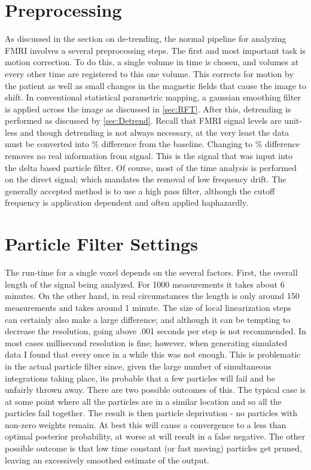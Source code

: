 \section{Preprocessing}
\label{sec:Methods Preprocessing}
As discussed in the section on de-trending, the normal pipeline for analyzing
FMRI involves a several preprocessing steps. The first and most important
task is motion correction. To do this, a single volume in time is chosen, and
volumes at every other time are registered to this one volume. This corrects
for motion by the patient as well as small changes in the magnetic
fields that cause the image to shift. 
In conventional statistical parametric mapping, a gaussian smoothing
filter is applied across the image as discussed in \autoref{sec:RFT}.
After this, detrending is performed as discussed by \autoref{sec:Detrend}.
Recall that FMRI signal levels are unit-less and though detrending is not
always necessary, at the very least the data must be converted 
into \% difference from the baseline. Changing to 
\% difference removes no real information
from signal. This is the signal that was input into the delta based 
particle filter. Of course, most of the time analysis is performed on the
direct signal; which mandates the removal of low frequency drift.
The generally accepted method is to use a high pass filter, although the
cutoff frequency is application dependent and often applied haphazardly.

\section{Particle Filter Settings}
The run-time for a single voxel depends on the several factors. First, the
overall length of the signal being analyzed. For 1000 measurements it takes
about 6 minutes. On the other hand, in real circumstances the
length is only around 150 measurements and takes around 1 minute. The size of 
local linearization steps can certainly also make a large difference; and 
although it can be tempting to decrease the resolution, going above .001 seconds
per step is not recommended. In most cases millisecond resolution
is fine; however, when generating simulated data I found that every once
in a while this was not enough. This is problematic in the actual particle
filter since, given the large number of simultaneous integrations taking 
place, its probable that a few particles will fail and be unfairly thrown away.
There are two possible outcomes of this. The typical case 
is at some point where all the particles are in a similar location and 
so all the particles fail together.
The result is then particle deprivation - no particles with non-zero weights remain.
At best this will cause a convergence to a less than optimal posterior 
probability, at worse at will result in a false negative. 
The other possible outcome is that low time constant (or fast moving)
particles get pruned, leaving an excessively smoothed estimate of the output. 

